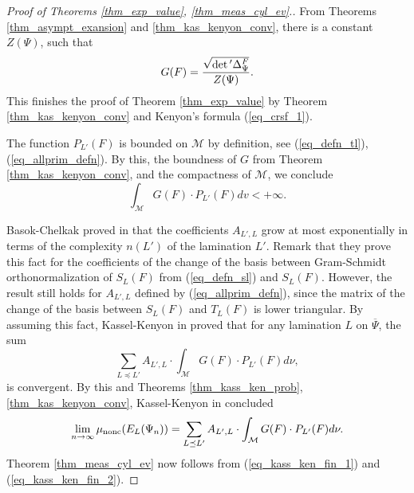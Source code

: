 \documentclass[12pt]{article}
\numberwithin{equation}{section}
\theoremstyle{theorem}
\theoremstyle{definition}
\theoremstyle{remark}
\newcommand{\laplcomp}{\Delta}
\begin{document}
	\begin{proof}[Proof of Theorems  \ref{thm_exp_value}, \ref{thm_meas_cyl_ev}.]
		From Theorems \ref{thm_asympt_exansion} and \ref{thm_kas_kenyon_conv}, there is a constant $Z(\Psi)$, such that
		\begin{equation}\label{eq_kass_ken_fin_1}
			G(F) = \frac{\sqrt{\smash[b]{\det{}' \laplcomp_{\Psi}^{F}}}}{Z(\Psi)}.
		\end{equation}
		This finishes the proof of Theorem \ref{thm_exp_value} by Theorem \ref{thm_kas_kenyon_conv} and Kenyon's formula (\ref{eq_crsf_1}).
		\par 
		The function $P_{L'}(F)$ is bounded on $\mathcal{M}$ by definition, see (\ref{eq_defn_tl}), (\ref{eq_allprim_defn}). By this, the boundness of $G$ from Theorem \ref{thm_kas_kenyon_conv}, and the compactness of $\mathcal{M}$, we conclude
		\begin{equation}\label{eq_kas_ken_int}
			\int_{\mathcal{M}} G(F) \cdot P_{L'}(F) dv < + \infty.
		\end{equation}
		\par 
		Basok-Chelkak proved in \cite[Theorem 4.9]{BasokChelk} that the coefficients $A_{L', L}$ grow at most exponentially in terms of the complexity $n(L')$ of the lamination $L'$. 
		Remark that they prove this fact for the coefficients of the change of the basis between Gram-Schmidt orthonormalization of $S_L(F)$ from (\ref{eq_defn_sl}) and $S_L(F)$. However, the result still holds for $A_{L', L}$ defined by (\ref{eq_allprim_defn}), since the matrix of the change of the basis between $S_L(F)$ and $T_L(F)$ is lower triangular.
		By assuming this fact, Kassel-Kenyon in \cite[proof of Theorem 18]{KassKenyon} proved that for any lamination $L$ on $\overline{\Psi}$, the sum 
			\begin{equation}
			\sum_{L \preceq L'} A_{L', L} \cdot \int_{\mathcal{M}} G(F)
			 \cdot P_{L'}(F) d \nu,
		\end{equation}
		is convergent.
		By this and Theorems \ref{thm_kass_ken_prob}, \ref{thm_kas_kenyon_conv}, Kassel-Kenyon in \cite[proof of Theorem 18]{KassKenyon} concluded
		\begin{equation}\label{eq_kass_ken_fin_2}
			\lim_{n \to \infty} \mu_{\rm{nonc}}(E_L(\Psi_n)) = \sum_{L \preceq L'} A_{L', L} \cdot \int_{\mathcal{M}}  G(F) \cdot P_{L'}(F) d \nu.
		\end{equation}
		Theorem \ref{thm_meas_cyl_ev} now follows from (\ref{eq_kass_ken_fin_1}) and (\ref{eq_kass_ken_fin_2}).
	\end{proof}
\end{document}
